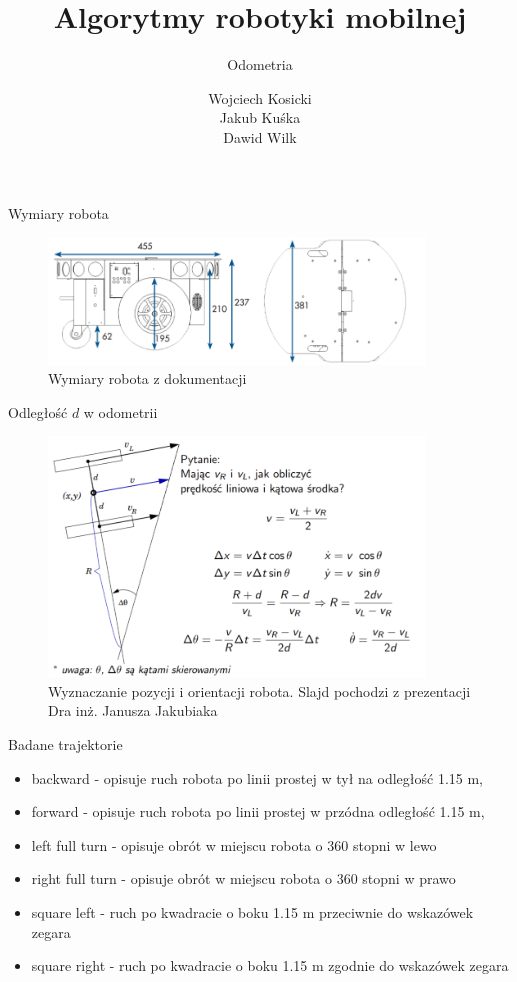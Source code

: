 \documentclass{beamer}
\title [Algorytmy robotyki mobilnej]
{Algorytmy robotyki mobilnej}
\subtitle
{
    Odometria\\
}
\author[Odometria] 
{
    Wojciech Kosicki\\
    Jakub Kuśka\\
    Dawid Wilk
}
\begin{document}
\frame{\titlepage}


\begin{frame}{Wymiary robota}
\begin{figure}
    \centering
    \includegraphics[width=10cm]{01.PNG}
    \caption{Wymiary robota z dokumentacji}
    \label{fig:my_label}
\end{figure}
\end{frame}

\begin{frame}{Odległość $d$ w odometrii}
\begin{figure}
    \centering
    \includegraphics[width=10cm]{02.PNG}
    \caption{Wyznaczanie pozycji i orientacji robota. Slajd pochodzi z prezentacji Dra inż. Janusza Jakubiaka}
    \label{fig:my_label}
\end{figure}
\end{frame}
\begin{frame}{Badane trajektorie}
\begin{itemize} 
\item backward - opisuje ruch robota po linii prostej w tył na odległość 1.15 m,
\item forward - opisuje ruch robota po linii prostej w przódna odległość 1.15 m,
\item left full turn - opisuje obrót w miejscu robota o 360 stopni w lewo
\item right full turn - opisuje obrót w miejscu robota o 360 stopni w prawo
\item square left - ruch po kwadracie o boku 1.15 m przeciwnie do wskazówek zegara
\item square right - ruch po kwadracie o boku 1.15 m zgodnie do wskazówek zegara
\end{itemize}
\end{frame}
\end{document}
